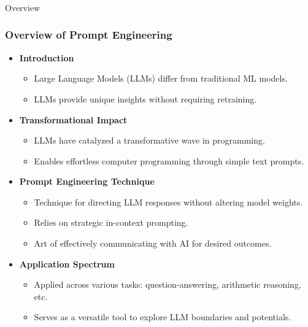 \begin{frame}[fragile]\frametitle{}
\begin{center}
{\Large Overview}
\end{center}
\end{frame}

\begin{frame}[fragile]\frametitle{Overview of Prompt Engineering}

\begin{itemize}
  \item \textbf{Introduction}
    \begin{itemize}
      \item Large Language Models (LLMs) differ from traditional ML models.
      \item LLMs provide unique insights without requiring retraining.
    \end{itemize}
  
  \item \textbf{Transformational Impact}
    \begin{itemize}
      \item LLMs have catalyzed a transformative wave in programming.
      \item Enables effortless computer programming through simple text prompts.
    \end{itemize}

  \item \textbf{Prompt Engineering Technique}
    \begin{itemize}
      \item Technique for directing LLM responses without altering model weights.
      \item Relies on strategic in-context prompting.
      \item Art of effectively communicating with AI for desired outcomes.
    \end{itemize}
  
  \item \textbf{Application Spectrum}
    \begin{itemize}
      \item Applied across various tasks: question-answering, arithmetic reasoning, etc.
      \item Serves as a versatile tool to explore LLM boundaries and potentials.
    \end{itemize}
\end{itemize}

\end{frame}

